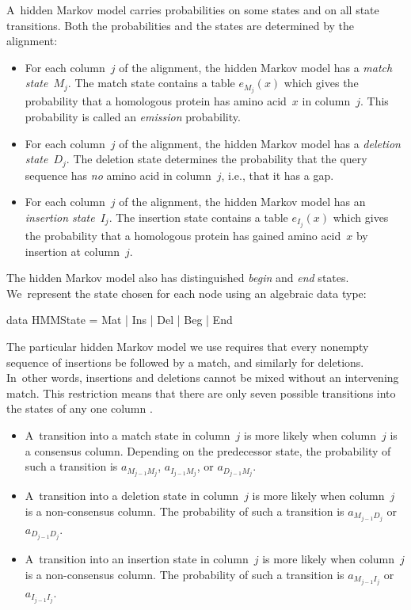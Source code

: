 \documentclass[nonatbib]{sigplanconf}
\newcommand\txprobj[3][]{a#1_{#2_{j-1}#3_j}}
\newcommand\txprobjj[3][]{a#1_{#2_{j-1}#3_j}}
\newenvironment{smallverbatim}{\par\small\verbatim}{\endverbatim}
\let\cite\citep
\begin{document}
A~hidden Markov model carries probabilities on some states and on all
state transitions.
Both the probabilities and the states are determined by the alignment:
\begin{itemize}
\item
For each column~$j$ of the alignment, the hidden Markov model has a
\emph{match state}~$M_j$.
The match state contains a table $e_{M_j}(x)$ which gives the
 probability that a homologous protein has amino acid~$x$ in
 column~$j$.
This probability is called an \emph{emission} probability.
\item
For each column~$j$ of the alignment, the hidden Markov model has a
\emph{deletion state}~$D_j$.
The deletion state determines the probability that the query sequence
has \emph{no} amino acid  in column~$j$, i.e., that it has a gap.
\item 
For each column~$j$ of the alignment, the hidden Markov model has an
\emph{insertion state}~$I_j$.
The insertion state contains a table $e_{I_j}(x)$ which gives the
probability that a homologous protein has gained amino acid~$x$ by
insertion at column~$j$.
\end{itemize}
The hidden Markov model also has distinguished \emph{begin} and \emph{end} states.
We~represent the state chosen for each node using an algebraic data type:
\begin{smallverbatim}
data HMMState = Mat | Ins | Del | Beg | End
\end{smallverbatim}


The particular hidden Markov model we use requires that every nonempty
sequence of insertions be followed by a match, and similarly for
deletions.
In~other words, insertions and deletions cannot be mixed without an
intervening match.
This restriction means that there are only seven possible transitions
into the states of any one column \cite{Eddy:1998ut}. 
\begin{itemize} 
\item
A~transition into a match state in
column~$j$ is more likely when column~$j$ is a consensus column.
Depending on the predecessor state, 
the probability of such a transition is 
$\txprobj M M$, $\txprobj I M$, or $\txprobj D M$.
\item
A~transition into a deletion state in
 column~$j$ is more likely when column~$j$ is a non-consensus column.
The probability of such a transition is 
$\txprobj M D$ or $\txprobj D D$.
\item
A~transition into an insertion state in
 column~$j$ is more likely when column~$j$ is a non-consensus column.
The probability of such a transition is 
$\txprobjj M I$ or $\txprobjj I I$.
\end{itemize}
\end{document}
